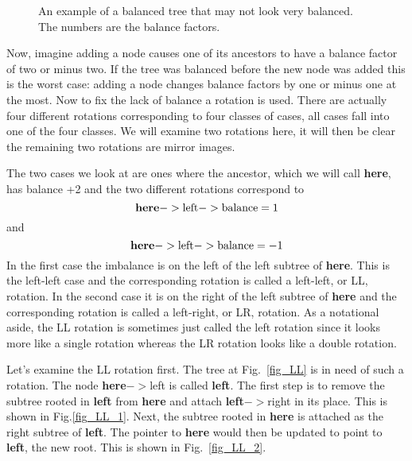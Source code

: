 \documentclass[11pt,a4paper]{scrartcl}
\begin{document}
\begin{figure}
\begin{center}
\end{center}
\caption{An example of a balanced tree that may not look very balanced. The numbers are the balance factors.\label{fig_odd_balance}}
\end{figure}

Now, imagine adding a node causes one of its ancestors to have a
balance factor of two or minus two. If the tree was balanced before
the new node was added this is the worst case: adding a node changes
balance factors by one or minus one at the most. Now to fix the lack
of balance a rotation is used. There are actually four different
rotations corresponding to four classes of cases, all cases fall into
one of the four classes. We will examine two rotations here, it will
then be clear the remaining two rotations are mirror images. 

The two cases we look at are ones where the ancestor, which we will
call \textbf{here}, has balance +2 and the two different rotations
correspond to 
\begin{equation}
\mbox{\textbf{here}}->\mbox{left}->\mbox{balance}=1 
\end{equation}
and 
\begin{equation}
\mbox{\textbf{here}}->\mbox{left}->\mbox{balance}=-1 
\end{equation}
In the first case the imbalance is on the left of the left subtree of
\textbf{here}. This is the left-left case and the corresponding rotation is
called a left-left, or LL, rotation. In the second case it is on the
right of the left subtree of \textbf{here} and the corresponding rotation is
called a left-right, or LR, rotation. As a notational aside, the LL
rotation is sometimes just called the left rotation since it looks more
like a single rotation whereas the LR rotation looks like a double
rotation.

Let's examine the LL rotation first. The tree at Fig.~\ref{fig_LL} is
in need of such a rotation. The node \textbf{here}$->$left is called \textbf{
  left}. The first step is to remove the subtree rooted in \textbf{left}
from \textbf{here} and attach \textbf{left}$->$right in its place. This is
shown in Fig.\ref{fig_LL_1}. Next, the subtree rooted in \textbf{here} is
attached as the right subtree of \textbf{left}. The pointer to \textbf{here}
would then be updated to point to \textbf{left}, the new root. This is
shown in Fig.~\ref{fig_LL_2}. 
\end{document}
